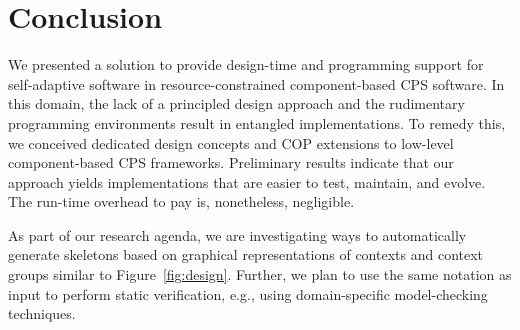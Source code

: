 \section{Conclusion}
\label{sec:ending}

We presented a solution to provide design-time and programming support
for self-adaptive software in re\-sour\-ce-constrained component-based
CPS software. In this domain, the lack of a principled design approach
and the rudimentary programming environments result in entangled
implementations. To remedy this, we conceived dedicated design
concepts and COP extensions to low-level component-based CPS
frameworks. Preliminary results indicate that our approach yields
implementations that are easier to test, maintain, and evolve. The
run-time overhead to pay is, nonetheless, negligible.



As part of our research agenda, we are investigating ways to
automatically generate \conesc skeletons based on graphical
representations of contexts and context groups similar to
Figure~\ref{fig:design}. Further, we plan to use the same notation as
input to perform static verification, e.g., using domain-specific
model-checking techniques.

